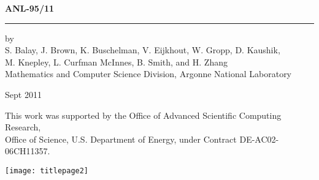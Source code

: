 \documentclass[twoside,11pt]{../sty/report_petsc}
\begin{document}



\hfill {\large{\bf ANL-95/11}}

\vspace*{3in}
\vspace*{8pt}
\hrule
\vspace*{8pt}

\vspace*{1in}
\noindent by \\
S. Balay, J. Brown, K. Buschelman, V. Eijkhout, W. Gropp, D. Kaushik, \\
M. Knepley, L. Curfman McInnes, B. Smith, and H. Zhang \\
Mathematics and Computer Science Division, Argonne National Laboratory

\vspace*{10pt}
\noindent Sept 2011

\vspace*{20pt}
\noindent This work was supported by the Office of Advanced Scientific Computing Research, \\
Office of Science, U.S. Department of Energy, under Contract DE-AC02-06CH11357.


\begin{figure*}[hbt]
\centerline{\texttt{[image: titlepage2]}}
\caption{}
\end{figure*}


\cleardoublepage
\pagestyle{plain}

\vspace{1in}
\date{\today}



\cleardoublepage



\medskip \medskip

\cleardoublepage
\end{document}
